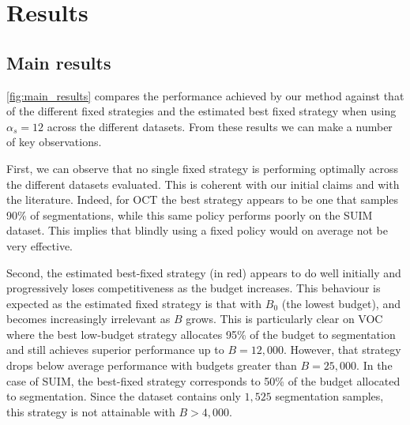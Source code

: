 \section{Results}
\label{sec:fullweak_results}

\subsection{Main results}
\cref{fig:main_results} compares the performance achieved by our method against that of the different fixed strategies and the estimated best fixed strategy when using $\alpha_s = 12$ across the different datasets. From these results we can make a number of key observations. 

First, we can observe that no single fixed strategy is performing optimally across the different datasets evaluated. This is coherent with our initial claims and with the literature. Indeed, for OCT the best strategy appears to be one that samples 90\% of segmentations, while this same policy performs poorly on the SUIM dataset. This implies that blindly using a fixed policy would on average not be very effective.

Second, the estimated best-fixed strategy (in red) appears to do well initially and progressively loses competitiveness as the budget increases. This behaviour is expected as the estimated fixed strategy is that with $B_0$ (the lowest budget), and becomes increasingly irrelevant as $B$ grows. This is particularly clear on VOC where the best low-budget strategy allocates 95\% of the budget to segmentation and still achieves superior performance up to $B=12,000$. However, that strategy drops below average performance with budgets greater than $B=25,000$. In the case of SUIM, the best-fixed strategy corresponds to 50\% of the budget allocated to segmentation. Since the dataset contains only $1,525$ segmentation samples, this strategy is not attainable with $B > 4,000$.

